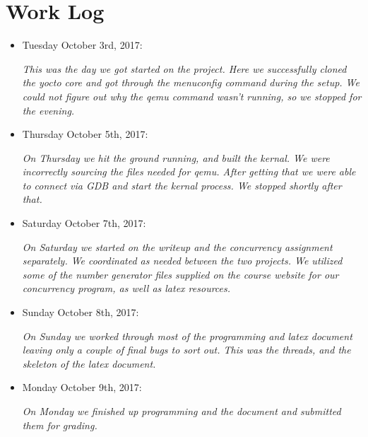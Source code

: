 \documentclass[letterpaper,10pt,titlepage]{article}
\begin{document}
\section*{Work Log}
\begin{itemize}
\item{Tuesday October 3rd, 2017:}

\textsl{This was the day we got started on the project. Here we successfully 
cloned the yocto core and got through the menuconfig command during the setup. 
We could not figure out why the qemu command wasn't running, so we stopped for 
the evening.}
\item{Thursday October 5th, 2017:}

\textsl{On Thursday we hit the ground running, and built the kernal. We were 
incorrectly sourcing the files needed for qemu. After getting that we were able 
to connect via GDB and start the kernal process. We stopped shortly after that. }
\item{Saturday October 7th, 2017:}

\textsl{On Saturday we started on the writeup and the concurrency assignment 
separately. We coordinated as needed between the two projects. We utilized some 
of the number generator files supplied on the course website for our 
concurrency program, as well as latex resources. }

\item{Sunday October 8th, 2017:}

\textsl{On Sunday we worked through most of the programming and latex document 
leaving only a couple of final bugs to sort out. This was the threads, and the 
skeleton of the latex document.}

\item{Monday October 9th, 2017:}

\textsl{On Monday we finished up programming and the document and submitted 
them for grading.}

\end{itemize}
\end{document}
